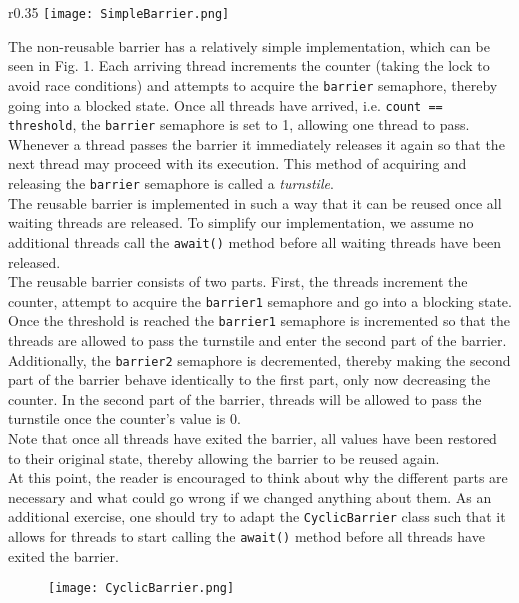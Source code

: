 \documentclass[main]{subfiles}
\begin{document}
\begin{wrapfigure}{r}{0.35\textwidth} %
    \centering
    \vspace{-10pt}
    \texttt{[image: SimpleBarrier.png]}
\end{wrapfigure}
\vspace{0pt}
\noindent The non-reusable barrier has a relatively simple implementation, which can be seen in Fig. 1. Each arriving thread increments the counter (taking the lock to avoid race conditions) and attempts to acquire the \texttt{barrier} semaphore, thereby going into a blocked state. Once all threads have arrived, i.e. \texttt{count == threshold}, the \texttt{barrier} semaphore is set to 1, allowing one thread to pass. Whenever a thread passes the barrier it immediately releases it again so that the next thread may proceed with its execution. This method of acquiring and releasing the \texttt{barrier} semaphore is called a \textit{turnstile}.\\[3mm]


\noindent The reusable barrier is implemented in such a way that it can be reused once all waiting threads are released. To simplify our implementation, we assume no additional threads call the \texttt{await()} method before all waiting threads have been released.\\
The reusable barrier consists of two parts. First, the threads increment the counter, attempt to acquire the \texttt{barrier1} semaphore and go into a blocking state. Once the threshold is reached the \texttt{barrier1} semaphore is incremented so that the threads are allowed to pass the turnstile and enter the second part of the barrier. Additionally, the \texttt{barrier2} semaphore is decremented, thereby making the second part of the barrier behave identically to the first part, only now decreasing the counter. In the second part of the barrier, threads will be allowed to pass the turnstile once the counter's value is 0.\\
Note that once all threads have exited the barrier, all values have been restored to their original state, thereby allowing the barrier to be reused again.\\[3mm]
At this point, the reader is encouraged to think about why the different parts are necessary and what could go wrong if we changed anything about them. As an additional exercise, one should try to adapt the \texttt{CyclicBarrier} class such that it allows for threads to start calling the \texttt{await()} method before all threads have exited the barrier.
\begin{figure}[H]
    \centering
    \texttt{[image: CyclicBarrier.png]}
\end{figure}
\newpage
\end{document}
